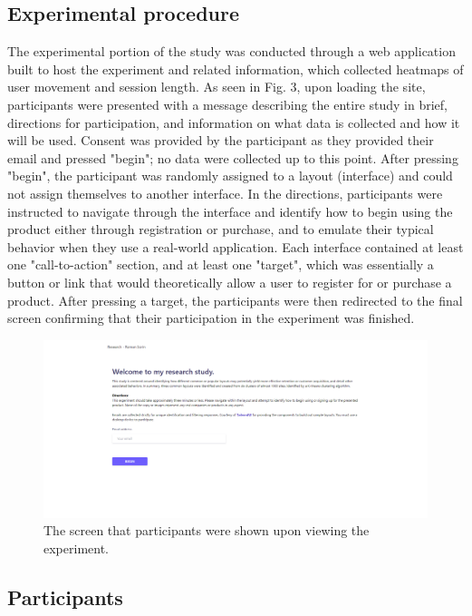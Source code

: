 \documentclass[conference]{IEEEtran}
\begin{document}
\subsection{Experimental procedure}

The experimental portion of the study was conducted through a web application built to host the experiment and related information, which collected heatmaps of user movement and session length. As seen in Fig. 3, upon loading the site, participants were presented with a message describing the entire study in brief, directions for participation, and information on what data is collected and how it will be used. Consent was provided by the participant as they provided their email and pressed "begin"; no data were collected up to this point. After pressing "begin", the participant was randomly assigned to a layout (interface) and could not assign themselves to another interface. In the directions, participants were instructed to navigate through the interface and identify how to begin using the product either through registration or purchase, and to emulate their typical behavior when they use a real-world application. Each interface contained at least one "call-to-action" section, and at least one "target", which was essentially a button or link that would theoretically allow a user to register for or purchase a product. After pressing a target, the participants were then redirected to the final screen confirming that their participation in the experiment was finished.

\begin{figure}[ht]
\centering
\label{fig:landing}
\includegraphics[width=\textwidth]{media/landing.png}
\caption{The screen that participants were shown upon viewing the experiment.}
\end{figure}


\subsection{Participants}
\end{document}

